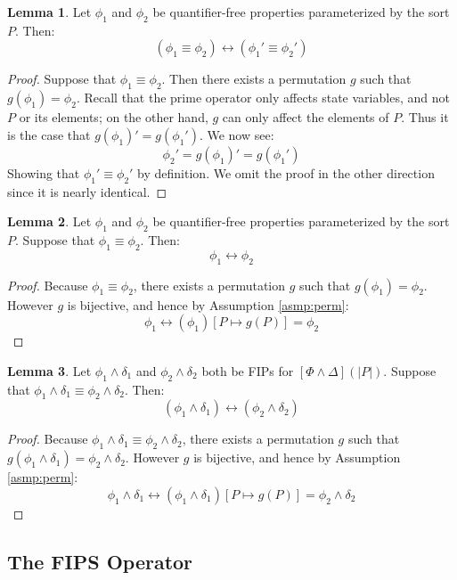 \documentclass[12pt]{article}
\theoremstyle{definition}
\newtheorem{lemma}{Lemma}
\theoremstyle{remark}
\begin{document}
\begin{lemma}
  \label{lem:prime-bijec}
  Let $\phi_1$ and $\phi_2$ be quantifier-free properties parameterized by the sort $P$.  Then:
  $$(\phi_1 \equiv \phi_2) \leftrightarrow (\phi_1' \equiv \phi_2')$$
\end{lemma}
\begin{proof}
  Suppose that $\phi_1 \equiv \phi_2$.  Then there exists a permutation $g$ such that $g(\phi_1) = \phi_2$.  Recall that the prime operator only affects state variables, and not $P$ or its elements; on the other hand, $g$ can only affect the elements of $P$.  Thus it is the case that $g(\phi_1)' = g(\phi_1')$.  We now see:
  $$\phi_2' = g(\phi_1)' = g(\phi_1')$$
  Showing that $\phi_1' \equiv \phi_2'$ by definition.  We omit the proof in the other direction since it is nearly identical.
\end{proof}

\begin{lemma}
  \label{lem:phi-eqiv-bijec}
  Let $\phi_1$ and $\phi_2$ be quantifier-free properties parameterized by the sort $P$.  Suppose that $\phi_1 \equiv \phi_2$.  Then:
  $$\phi_1 \leftrightarrow \phi_2$$
\end{lemma}
\begin{proof}
  Because $\phi_1 \equiv \phi_2$, there exists a permutation $g$ such that $g(\phi_1) = \phi_2$.  However $g$ is bijective, and hence by Assumption \ref{asmp:perm}:
  $$\phi_1 \leftrightarrow (\phi_1)[P \mapsto g(P)] = \phi_2$$
\end{proof}

\begin{lemma}
  \label{lem:fip-eqiv-bijec}
  Let $\phi_1\land\delta_1$ and $\phi_2\land\delta_2$ both be FIPs for $[\Phi\land\Delta](|P|)$.  Suppose that $\phi_1\land\delta_1 \equiv \phi_2\land\delta_2$.  Then:
  $$(\phi_1 \land \delta_1) \leftrightarrow (\phi_2 \land \delta_2)$$
\end{lemma}
\begin{proof}
  Because $\phi_1\land\delta_1 \equiv \phi_2\land\delta_2$, there exists a permutation $g$ such that $g(\phi_1\land\delta_1) = \phi_2\land\delta_2$.  However $g$ is bijective, and hence by Assumption \ref{asmp:perm}:
  $$\phi_1\land\delta_1 \leftrightarrow (\phi_1\land\delta_1)[P \mapsto g(P)] = \phi_2\land\delta_2$$
\end{proof}

\subsection{The FIPS Operator}
\end{document}
